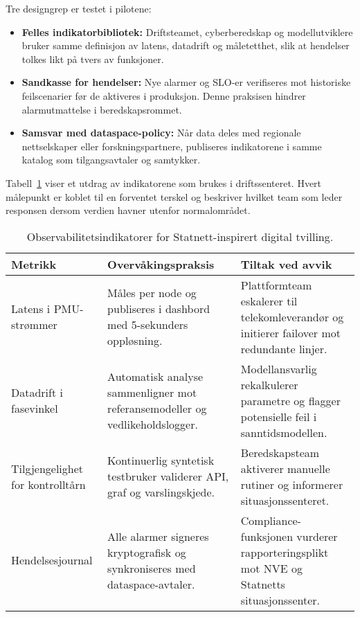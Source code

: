 Tre designgrep er testet i pilotene:
\begin{itemize}
    \item \textbf{Felles indikatorbibliotek:} Driftsteamet, cyberberedskap og modellutviklere bruker samme definisjon av latens, datadrift og måletetthet, slik at hendelser tolkes likt på tvers av funksjoner.
    \item \textbf{Sandkasse for hendelser:} Nye alarmer og SLO-er verifiseres mot historiske feilscenarier før de aktiveres i produksjon. Denne praksisen hindrer alarmutmattelse i beredskapsrommet.
    \item \textbf{Samsvar med dataspace-policy:} Når data deles med regionale nettselskaper eller forskningspartnere, publiseres indikatorene i samme katalog som tilgangsavtaler og samtykker.
\end{itemize}

Tabell~\ref{tab:kap03-observabilitet-kraft} viser et utdrag av indikatorene som brukes i driftssenteret. Hvert målepunkt er koblet til en forventet terskel og beskriver hvilket team som leder responsen dersom verdien havner utenfor normalområdet.

\begin{table}[ht]
    \centering
    \caption{Observabilitetsindikatorer for Statnett-inspirert digital tvilling.}
    \label{tab:kap03-observabilitet-kraft}
    \begin{tabular}{p{}p{}p{}}
        \toprule
        \textbf{Metrikk} & \textbf{Overvåkingspraksis} & \textbf{Tiltak ved avvik} \\
        \midrule
        Latens i PMU-strømmer & Måles per node og publiseres i dashbord med 5-sekunders oppløsning. & Plattformteam eskalerer til telekomleverandør og initierer failover mot redundante linjer. \\
        Datadrift i fasevinkel & Automatisk analyse sammenligner mot referansemodeller og vedlikeholdslogger. & Modellansvarlig rekalkulerer parametre og flagger potensielle feil i sanntidsmodellen. \\
        Tilgjengelighet for kontrolltårn & Kontinuerlig syntetisk testbruker validerer API, graf og varslingskjede. & Beredskapsteam aktiverer manuelle rutiner og informerer situasjonssenteret. \\
        Hendelsesjournal & Alle alarmer signeres kryptografisk og synkroniseres med dataspace-avtaler. & Compliance-funksjonen vurderer rapporteringsplikt mot NVE og Statnetts situasjonssenter. \\
        \bottomrule
    \end{tabular}
\end{table}

